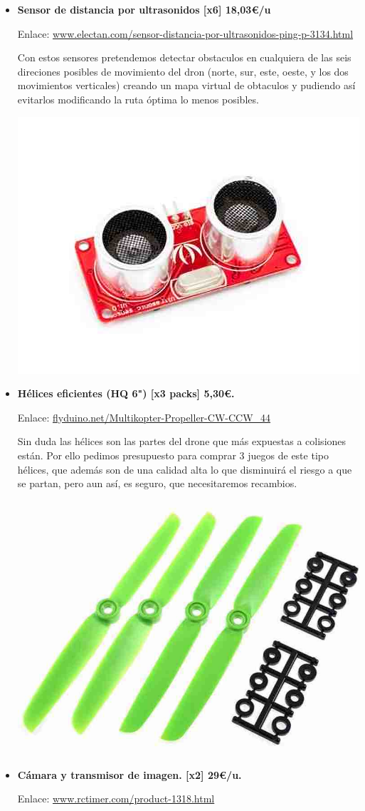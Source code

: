 \documentclass[12pt,twoside]{report}
\begin{document}
\begin{itemize}
\item  {\bf Sensor de distancia por ultrasonidos [x6] 18,03\euro{}/u}

Enlace: \url{www.electan.com/sensor-distancia-por-ultrasonidos-ping-p-3134.html}

Con estos sensores pretendemos detectar obstaculos en cualquiera de las seis direciones posibles de movimiento del dron (norte, sur, este, oeste, y los dos movimientos verticales) creando un mapa virtual de obtaculos y pudiendo así evitarlos modificando la ruta óptima lo menos posibles.

\centerline{
    \includegraphics[width=0.45\linewidth]{fotos/sensor_ultra.jpg}}

\item {\bf Hélices eficientes (HQ 6") [x3 packs] 5,30\euro{}.}

Enlace: \url{flyduino.net/Multikopter-Propeller-CW-CCW_44}

Sin duda las hélices  son las partes del drone que más expuestas a colisiones están. Por ello pedimos presupuesto para comprar 3 juegos de este tipo hélices, que además son de una calidad alta lo que disminuirá el riesgo a que se partan, pero aun así, es seguro, que necesitaremos recambios.

\centerline{
    \includegraphics[width=0.45\linewidth]{fotos/helices.jpg}}

\item {\bf Cámara y transmisor de imagen. [x2] 29\euro{}/u.}

Enlace: \url{www.rctimer.com/product-1318.html}


\end{itemize}
\end{document}
